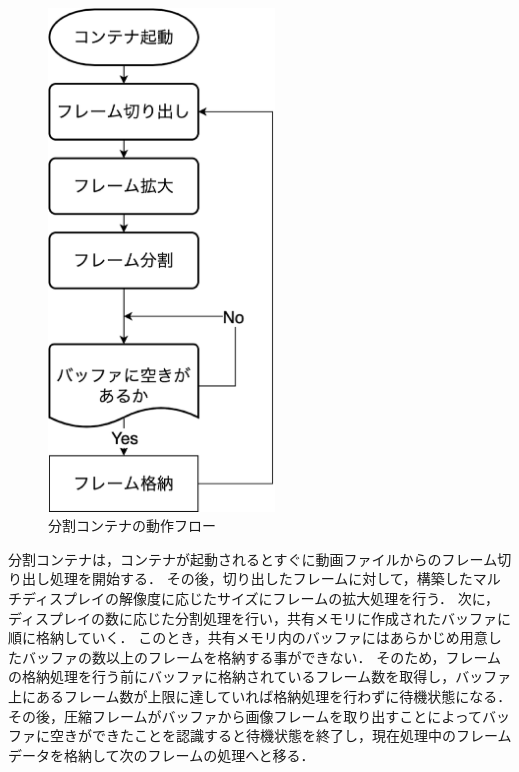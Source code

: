 \begin{figure}[H]
    \hspace*{\fill}
    \includegraphics[width=60mm]{./fig/chap3/bunkatu_flow.eps}
    \hspace*{\fill}
    \caption{分割コンテナの動作フロー}
    \label{divide_container}
\end{figure}

分割コンテナは，コンテナが起動されるとすぐに動画ファイルからのフレーム切り出し処理を開始する．
その後，切り出したフレームに対して，構築したマルチディスプレイの解像度に応じたサイズにフレームの拡大処理を行う．
次に，ディスプレイの数に応じた分割処理を行い，共有メモリに作成されたバッファに順に格納していく．
このとき，共有メモリ内のバッファにはあらかじめ用意したバッファの数以上のフレームを格納する事ができない．
そのため，フレームの格納処理を行う前にバッファに格納されているフレーム数を取得し，バッファ上にあるフレーム数が上限に達していれば格納処理を行わずに待機状態になる．
その後，圧縮フレームがバッファから画像フレームを取り出すことによってバッファに空きができたことを認識すると待機状態を終了し，現在処理中のフレームデータを格納して次のフレームの処理へと移る．

